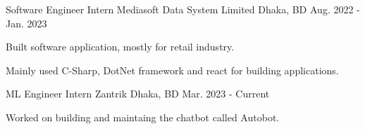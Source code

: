 

\begin{cventries}

  \cventry
    {Software Engineer Intern} %
    {Mediasoft Data System Limited} %
    {Dhaka, BD} %
    {Aug. 2022 - Jan. 2023} %
    {
      \begin{cvitems} %
        \item {Built software application, mostly for retail industry.}
        \item {Mainly used C-Sharp, DotNet framework and react for building applications.}
      \end{cvitems}
    }

    \cventry
    {ML Engineer Intern} %
    {Zantrik} %
    {Dhaka, BD} %
    {Mar. 2023 - Current} %
    {
      \begin{cvitems} %
        \item {Worked on building and maintaing the chatbot called Autobot.}
      \end{cvitems}
    }

\end{cventries}
